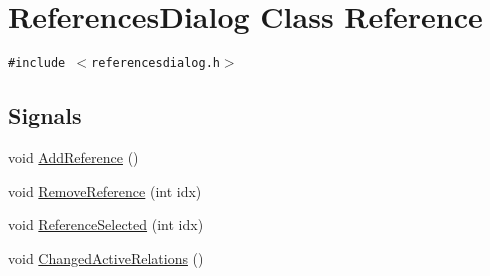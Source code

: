\hypertarget{class_references_dialog}{
\section{ReferencesDialog Class Reference}
\label{class_references_dialog}
}
{\tt \#include $<$referencesdialog.h$>$}

\subsection*{Signals}
\begin{CompactItemize}
\item 
void \hyperlink{class_references_dialog_949cf022393090a9667c32d64b14ef15}{AddReference} ()
\item 
void \hyperlink{class_references_dialog_a3d2a1436ffccecfb90117d0ddd3803d}{RemoveReference} (int idx)
\item 
void \hyperlink{class_references_dialog_39a4813aa0df07c357d324b851ec0d27}{ReferenceSelected} (int idx)
\item 
void \hyperlink{class_references_dialog_13951c9836dd020be07f1d733efeefe7}{ChangedActiveRelations} ()
\end{CompactItemize}
